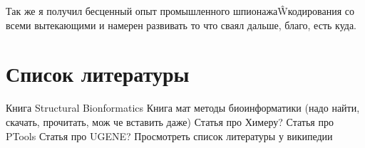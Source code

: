 \documentclass[a4paper, 14pt, titlepage, utf8]{extarticle}
\begin{document}
Так же я получил бесценный опыт промышленного шпионажа\^Wкодирования со всеми вытекающими и намерен развивать то что сваял дальше, благо, есть куда.

\section{Список литературы}

Книга Structural Bionformatics
Книга мат методы биоинформатики (надо найти, скачать, прочитать, мож че вставить даже)
Статья про Химеру?
Статья про PTools
Статья про UGENE?
Просмотреть список литературы у википедии
\end{document}
